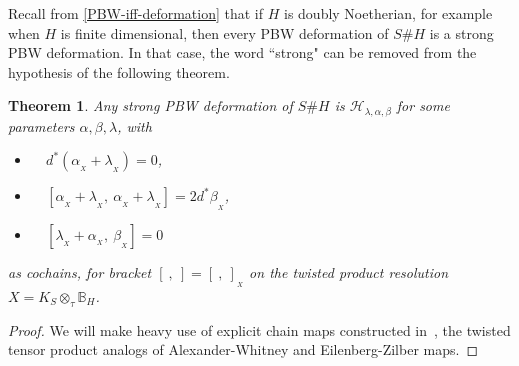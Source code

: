 \documentclass[11pt]{amsart}
\numberwithin{equation}{section}
\newtheorem{thm}[equation]{Theorem}
\newcommand{\X}{_X}
\newcommand{\alphax}{\alpha_{\X}}
\newcommand{\betax}{\beta_{\X}}
\newcommand{\lambdax}{\lambda_{\X}}
\newcommand{\chabl}{\cH_{\lambda,\alpha,\beta}}
\newcommand{\BB}{\mathbb{B}} %
\renewcommand{\_}[1]{\mbox{$_{\left( #1 \right)}$}}
\newcommand{\ott}{\otimes_{\tau}}
\newcommand{\Ho}{H}%
\newcommand{\cH}{\mathcal{H}}
\begin{document}
{Recall from \cref{PBW-iff-deformation} that if
$H$ is doubly Noetherian, for example when $H$ is finite dimensional, 
then every PBW deformation
of $S\# H$ is a strong PBW deformation.
In that case, 
the word ``strong" can be removed from 
the hypothesis of the following theorem. 

\vspace{2ex}

\begin{thm}\label{ForwardsDirection}
Any strong PBW deformation of $S\#H$ is 
$\chabl$ for 
some parameters $\alpha,\beta,\lambda$, 
with
   \begin{itemize}
    \item[(a)]\ \ $d^*(\alphax+\lambdax) = 0$, 
    \item[(b)]\ \ $[\alphax+\lambdax,\ \alphax + \lambdax]=2d^*\betax$, 
    \item[(c)]\ \ $[\lambdax + \alphax,\ \betax]= 0$\, 
  \end{itemize}
as cochains, for bracket $[\ ,\ ]=[\ ,  \ ]_{\X}$ on the twisted product resolution 
$X=K_S\ott \BB_\Ho$.
\end{thm} 

\vspace{1ex}

\begin{proof}
We will make heavy use of explicit chain maps 
constructed in~\cite{TTP-AWEZ},
the twisted tensor product analogs of
Alexander-Whitney and Eilenberg-Zilber maps. 


\end{proof}}
\end{document}
